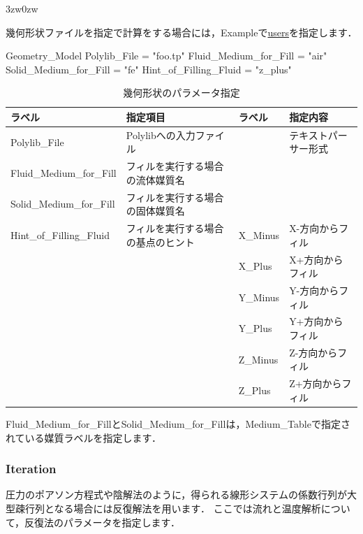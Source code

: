 \begin{indentation}{3zw}{0zw}

幾何形状ファイルを指定で計算をする場合には，Exampleで\hyperlink{tgt:example}{users}を指定します．

{\small
\begin{program}
  Geometry_Model {
    Polylib_File          = "foo.tp"
    Fluid_Medium_for_Fill = "air"
    Solid_Medium_for_Fill = "fe"
    Hint_of_Filling_Fluid = "z_plus"
  }
\end{program}
}


\begin{table}[htdp]
\caption{幾何形状のパラメータ指定}
\begin{center}
\small
\begin{tabular}{llll} \toprule
ラベル & 指定項目 & ラベル & 指定内容 \\ \midrule
Polylib\_File & Polylibへの入力ファイル & & テキストパーサー形式\\
Fluid\_Medium\_for\_Fill & フィルを実行する場合の流体媒質名 & & \\
Solid\_Medium\_for\_Fill & フィルを実行する場合の固体媒質名 & & \\
Hint\_of\_Filling\_Fluid & フィルを実行する場合の基点のヒント & X\_Minus & X-方向からフィル\\
& & X\_Plus  & X+方向からフィル\\
& & Y\_Minus & Y-方向からフィル\\
& & Y\_Plus  & Y+方向からフィル\\
& & Z\_Minus & Z-方向からフィル\\
& & Z\_Plus  & Z+方向からフィル\\
\bottomrule
\end{tabular}
\end{center}
\label{tbl:file_geometry}
\end{table}

Fluid\_Medium\_for\_FillとSolid\_Medium\_for\_Fillは，Medium\_Tableで指定されている媒質ラベルを指定します．

\end{indentation}



\pagebreak
\subsubsection{Iteration}

圧力のポアソン方程式や陰解法のように，得られる線形システムの係数行列が大型疎行列となる場合には反復解法を用います．
ここでは流れと温度解析について，\hypertarget{tgt:iteration}{反復法のパラメータを指定}します．

